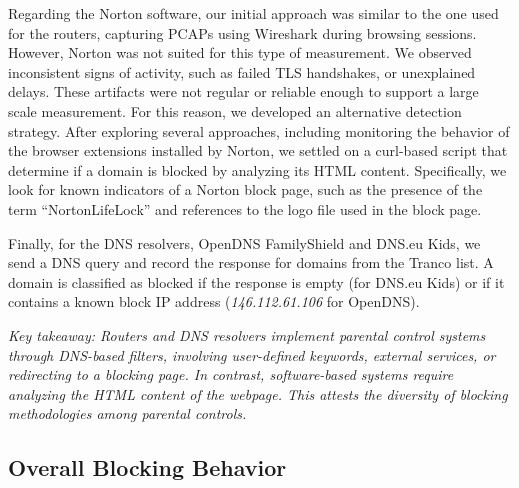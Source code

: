Regarding the Norton software, our initial approach was similar to the one used for the routers, capturing PCAPs using Wireshark during browsing sessions. However, Norton was not suited for this type of measurement. We observed inconsistent signs of activity, such as failed TLS handshakes, or unexplained delays. These artifacts were not regular or reliable enough to support a large scale measurement. For this reason, we developed an alternative detection strategy. After exploring several approaches, including monitoring the behavior of the browser extensions installed by Norton, we settled on a curl-based script that determine if a domain is blocked by analyzing its HTML content. Specifically, we look for known indicators of a Norton block page, such as the presence of the term “NortonLifeLock” and references to the logo file used in the block page.

Finally, for the DNS resolvers, OpenDNS FamilyShield and DNS.eu Kids, we send a DNS query and record the response for domains from the Tranco list. A domain is classified as blocked if the response is empty (for DNS.eu Kids) or if it contains a known block IP address (\emph{146.112.61.106} for OpenDNS).


\textit{Key takeaway: Routers and DNS resolvers implement parental control systems through DNS-based filters, involving user-defined keywords, external services, or redirecting to a blocking page. In contrast, software-based systems require analyzing the HTML content of the webpage. This attests the diversity of blocking methodologies among parental controls.}

\subsection{Overall Blocking Behavior}  \label{sec:results-overallblocking}

